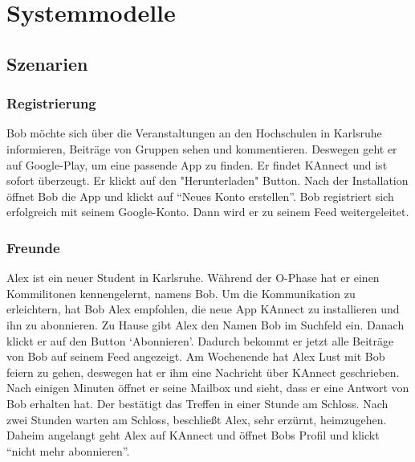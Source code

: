\documentclass[parskip=full]{scrartcl}
\begin{document}
	\section{Systemmodelle}
	\subsection{Szenarien}
		\subsubsection{Registrierung}
		Bob möchte sich über die Veranstaltungen an den Hochschulen in Karlsruhe informieren, Beiträge von Gruppen sehen und kommentieren. Deswegen geht er auf Google-Play, um eine passende App zu finden. Er findet KAnnect und ist sofort überzeugt. Er klickt auf den "Herunterladen" Button. Nach der Installation öffnet Bob die App und klickt auf “Neues Konto erstellen”. Bob registriert sich erfolgreich mit seinem Google-Konto. Dann wird er zu seinem Feed weitergeleitet.
		
		\subsubsection{Freunde}
		Alex ist ein neuer Student in Karlsruhe.  Während der O-Phase hat er einen Kommilitonen kennengelernt, namens Bob. Um die Kommunikation zu erleichtern, hat Bob Alex empfohlen, die neue App  KAnnect zu installieren und ihn zu abonnieren. Zu Hause gibt Alex den Namen Bob im Suchfeld ein. Danach klickt er auf den Button ‘Abonnieren’. Dadurch bekommt er jetzt alle Beiträge von Bob auf seinem Feed angezeigt. Am Wochenende hat Alex Lust mit Bob feiern zu gehen, deswegen hat er ihm eine Nachricht über KAnnect geschrieben. Nach einigen Minuten öffnet er seine Mailbox und sieht, dass er eine Antwort von Bob erhalten hat. Der bestätigt das Treffen in einer Stunde am Schloss. Nach zwei Stunden warten am Schloss, beschließt Alex, sehr erzürnt, heimzugehen. Daheim angelangt geht Alex auf KAnnect und öffnet Bobs Profil und klickt “nicht mehr abonnieren”.
		
\end{document}
